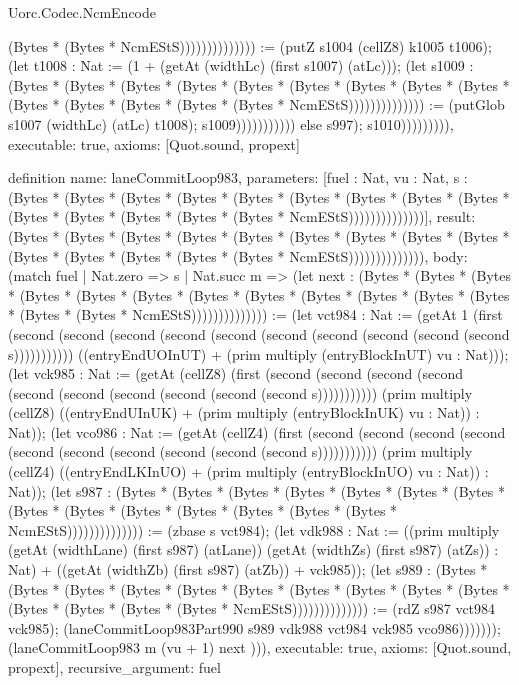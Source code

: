 \begin{lexlean}{Uorc.Codec.NcmEncode}
\begin{semanticmodule}
{(Bytes * (Bytes * NcmEStS)))))))))))))) := (putZ s1004 (cellZ8) k1005 t1006); (let t1008 : Nat := (1 + (getAt (widthLc) (first s1007) (atLc))); (let s1009 : (Bytes * (Bytes * (Bytes * (Bytes * (Bytes * (Bytes * (Bytes * (Bytes * (Bytes * (Bytes * (Bytes * (Bytes * (Bytes * (Bytes * NcmEStS)))))))))))))) := (putGlob s1007 (widthLc) (atLc) t1008); s1009))))))))))) else s997); s1010))))))))),
  executable: true,
  axioms: [Quot.sound, propext]
}

definition{
  name: laneCommitLoop983,
  parameters: [fuel : Nat, vu : Nat, s : (Bytes * (Bytes * (Bytes * (Bytes * (Bytes * (Bytes * (Bytes * (Bytes * (Bytes * (Bytes * (Bytes * (Bytes * (Bytes * (Bytes * NcmEStS))))))))))))))],
  result: (Bytes * (Bytes * (Bytes * (Bytes * (Bytes * (Bytes * (Bytes * (Bytes * (Bytes * (Bytes * (Bytes * (Bytes * (Bytes * (Bytes * NcmEStS)))))))))))))),
  body: (match fuel
    | Nat.zero => s
    | Nat.succ m => (let next : (Bytes * (Bytes * (Bytes * (Bytes * (Bytes * (Bytes * (Bytes * (Bytes * (Bytes * (Bytes * (Bytes * (Bytes * (Bytes * (Bytes * NcmEStS)))))))))))))) := (let vct984 : Nat := (getAt 1 (first (second (second (second (second (second (second (second (second (second (second s))))))))))) ((entryEndUOInUT) + (prim multiply (entryBlockInUT) vu : Nat))); (let vck985 : Nat := (getAt (cellZ8) (first (second (second (second (second (second (second (second (second (second (second s))))))))))) (prim multiply (cellZ8) ((entryEndUInUK) + (prim multiply (entryBlockInUK) vu : Nat)) : Nat)); (let vco986 : Nat := (getAt (cellZ4) (first (second (second (second (second (second (second (second (second (second (second s))))))))))) (prim multiply (cellZ4) ((entryEndLKInUO) + (prim multiply (entryBlockInUO) vu : Nat)) : Nat)); (let s987 : (Bytes * (Bytes * (Bytes * (Bytes * (Bytes * (Bytes * (Bytes * (Bytes * (Bytes * (Bytes * (Bytes * (Bytes * (Bytes * (Bytes * NcmEStS)))))))))))))) := (zbase s vct984); (let vdk988 : Nat := ((prim multiply (getAt (widthLane) (first s987) (atLane)) (getAt (widthZs) (first s987) (atZs)) : Nat) + ((getAt (widthZb) (first s987) (atZb)) + vck985)); (let s989 : (Bytes * (Bytes * (Bytes * (Bytes * (Bytes * (Bytes * (Bytes * (Bytes * (Bytes * (Bytes * (Bytes * (Bytes * (Bytes * (Bytes * NcmEStS)))))))))))))) := (rdZ s987 vct984 vck985); (laneCommitLoop983Part990 s989 vdk988 vct984 vck985 vco986))))))); (laneCommitLoop983 m (vu + 1) next ))),
  executable: true,
  axioms: [Quot.sound, propext],
  recursive_argument: fuel
}


\end{semanticmodule}
\end{lexlean}
